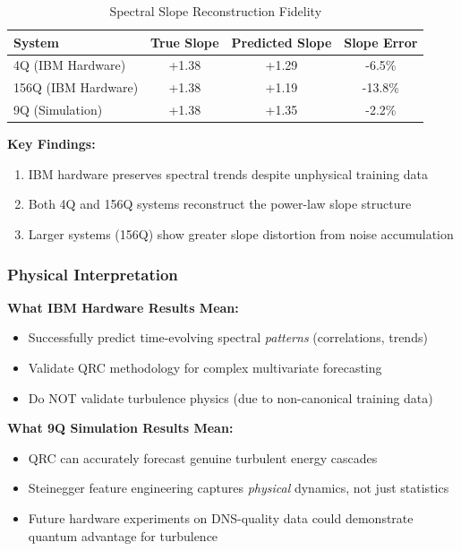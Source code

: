 \documentclass[conference]{IEEEtran}
\begin{document}
\begin{table}[!htbp]
\centering
\caption{Spectral Slope Reconstruction Fidelity}
\label{tab:spectral_slope_fidelity}
\begin{tabular}{@{}lccc@{}}
\toprule
\textbf{System} & \textbf{True Slope} & \textbf{Predicted Slope} & \textbf{Slope Error} \\
\midrule
4Q (IBM Hardware) & +1.38 & +1.29 & -6.5\% \\
156Q (IBM Hardware) & +1.38 & +1.19 & -13.8\% \\
9Q (Simulation) & +1.38 & +1.35 & -2.2\% \\
\bottomrule
\end{tabular}
\end{table}

\textbf{Key Findings:}
\begin{enumerate}
    \item IBM hardware preserves spectral trends despite unphysical training data
    \item Both 4Q and 156Q systems reconstruct the power-law slope structure
    \item Larger systems (156Q) show greater slope distortion from noise accumulation
\end{enumerate}

\subsubsection{Physical Interpretation}

\textbf{What IBM Hardware Results Mean:}
\begin{itemize}
    \item Successfully predict time-evolving spectral \textit{patterns} (correlations, trends)
    \item Validate QRC methodology for complex multivariate forecasting
    \item Do NOT validate turbulence physics (due to non-canonical training data)
\end{itemize}

\textbf{What 9Q Simulation Results Mean:}
\begin{itemize}
    \item QRC can accurately forecast genuine turbulent energy cascades
    \item Steinegger feature engineering captures \textit{physical} dynamics, not just statistics
    \item Future hardware experiments on DNS-quality data \cite{brunton2020machine, duraisamy2019turbulence} could demonstrate quantum advantage for turbulence
\end{itemize}
\end{document}
